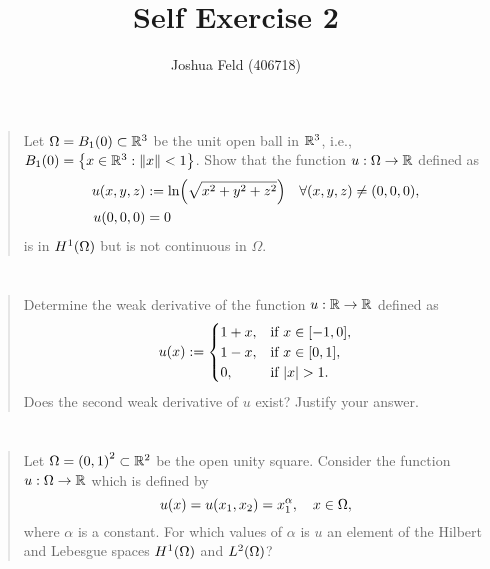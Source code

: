 \documentclass[english]{exercise}
\title{Self Exercise 2}
\author{Joshua Feld (406718)}
\begin{document}
	\maketitle


	\section{}

	\begin{quote}
		Let \(\Omega = B_1\parentheses*{0} \subset \R^3\) be the unit open ball in \(\R^3\), i.e., \(B_1\parentheses*{0} = \braces*{x \in \R^3 : \norm*{x} < 1}\).
		Show that the function \(u: \Omega \to \R\) defined as
		\begin{align*}
			u\parentheses*{x, y, z} &:= \ln\parentheses*{\sqrt{x^2 + y^2 + z^2}} \quad \forall \parentheses*{x, y, z} \ne \parentheses*{0, 0, 0},\\
			u\parentheses*{0, 0, 0} &= 0
		\end{align*}
		is in \(H^1\parentheses*{\Omega}\) but is not continuous in \(\Omega\).
	\end{quote}


	\section{}

	\begin{quote}
		Determine the weak derivative of the function \(u: \R \to \R\) defined as
		\[
			u\parentheses*{x} := \begin{cases}
				1 + x, & \text{if }x \in \brackets*{-1, 0},\\
				1 - x, & \text{if }x \in \brackets*{0, 1},\\
				0, & \text{if }\absolute*{x} > 1.
			\end{cases}
		\]
		Does the second weak derivative of \(u\) exist?
		Justify your answer.
	\end{quote}


	\section{}

	\begin{quote}
		Let \(\Omega = \parentheses*{0, 1}^2 \subset \R^2\) be the open unity square.
		Consider the function \(u: \Omega \to \R\) which is defined by
		\[
			u\parentheses*{x} = u\parentheses*{x_1, x_2} = x_1^\alpha, \quad x \in \Omega,
		\]
		where \(\alpha\) is a constant.
		For which values of \(\alpha\) is \(u\) an element of the Hilbert and Lebesgue spaces \(H^1\parentheses*{\Omega}\) and \(L^2\parentheses*{\Omega}\)?
	\end{quote}
\end{document}
